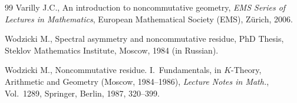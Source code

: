 \documentclass[pdftex]{sigma}
\numberwithin{equation}{section}
\begin{document}
\begin{thebibliography}{99}
Varilly J.C.,
An introduction to noncommutative geometry,
{\it EMS Series of Lectures in Mathematics}, European Mathematical Society (EMS), Z\"urich, 2006.

  Wodzicki M.,
  Spectral asymmetry and noncommutative residue,
  PhD Thesis, Steklov Mathematics Institute, Moscow, 1984 (in Russian).

Wodzicki M.,
Noncommutative residue. I.~Fundamentals, in  $K$-Theory, Arithmetic and Geometry (Moscow, 1984--1986), {\it Lecture Notes in Math.}, Vol.~1289, Springer, Berlin, 1987, 320--399.


\end{thebibliography}\LastPageEnding
\end{document}
